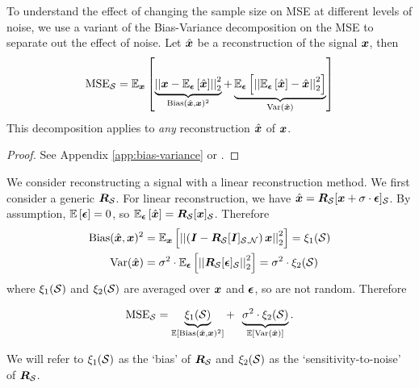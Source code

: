 To understand the effect of changing the sample size on MSE at different levels of noise, we use a variant of the Bias-Variance decomposition  \cite{geman1992neural} on the MSE to separate out the effect of noise. Let $\hat{\bm{x}}$ be a reconstruction of the signal $\bm{x}$, then
\begin{equation}
    \textrm{MSE}_{\set{S}} = \expect[\vect{x}]{\underbrace{\sqnormvec{\vect{x} - \expect[\vect{\epsilon}]{\hat{\vect{x}}}}}_{\text{Bias}(\hat{\vect{x}},\vect{x})^{2}} + \underbrace{\expect[\vect{\epsilon}]{\sqnormvec{ \expect[\vect{\epsilon}]{\hat{\vect{x}}} - \hat{\vect{x}}}}}_{\text{Var}(\hat{\vect{x}})}} \label{eq:Bias_var_decomp_general}
\end{equation}
This decomposition applies to \emph{any} reconstruction $\hat{\bm{x}}$ of $\bm{x}$.
\begin{proof}
    See Appendix \ref{app:bias-variance} or \cite[Chapter 5.4.4]{Goodfellow2016DeepLearning}.
\end{proof}

We consider reconstructing a signal with a linear reconstruction method. We first consider a generic $\bm{R}_{\mathcal{S}}$. 
\noindent For linear reconstruction, we have $\hat{\vect{x}} = \matr{R}_{\set{S}}\vectsubgen[\set{S}]{\vect{x} + \sigma \cdot \vect{\epsilon}}$. By assumption, $\expect{\vect{\epsilon}} = 0$, so $\expect[\vect{\epsilon}]{\hat{\vect{x}}} = \matr{R}_{\set{S}}\vectsub[S]{x}$. Therefore
\begin{align}
    \text{Bias}(\hat{\vect{x}}, \vect{x})^{2} &= \expect[\vect{x}]{\sqnormvec{\left(\matr{I} - \matr{R}_{\set{S}}\matrsub[S,N]{I}\right)\vect{x}}} 
 = \xi_{1}(\set{S}) \label{eq:def_bias_gen}\\
    \text{Var}(\hat{\vect{x}}) &= \sigma^{2} \cdot \expect[\vect{\epsilon}]{\sqnormvec{\matr{R}_{\set{S}}\vectsub[S]{\epsilon}}} = \sigma^{2} \cdot \xi_{2}(\set{S})\label{eq:def_var_gen}
\end{align}
where $\xi_{1}(\mathcal{S})$ and $\xi_{2}(\mathcal{S})$ are averaged over $\bm{x}$ and $\bm{\epsilon}$, so are not random. Therefore

\begin{equation}
    \textrm{MSE}_{\set{S}} = \underbrace{\xi_{1}(\set{S})}_{\expect{\textrm{Bias}(\hat{\vect{x}},\vect{x})^{2}}} + \enspace \underbrace{\sigma^{2} \cdot \xi_{2}(\set{S})}_{\expect{\textrm{Var}(\hat{\vect{x}})}}. \label{eq:xi_decomp}
\end{equation}

\noindent We will refer to $\xi_{1}(\mathcal{S})$ as the `bias' of $\bm{R}_{\mathcal{S}}$ and $\xi_{2}(\mathcal{S})$ as the `sensitivity-to-noise' of $\bm{R}_{\mathcal{S}}$. 

